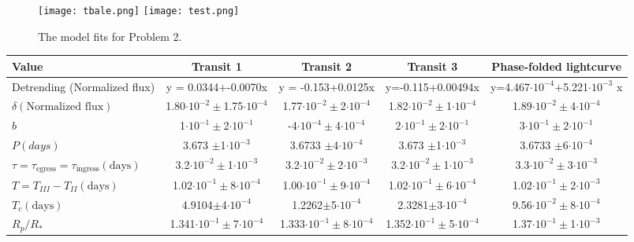 \documentclass[10pt, preprint]{aastex}
\begin{document}
\begin{figure}
\texttt{[image: tbale.png]}
\endminipage
{}
\texttt{[image: test.png]}
\endminipage\hfill
\caption{The model fits for Problem 2.\label{chi}}
\end{figure}

\begin{table}
  \footnotesize
  \begin{tabular}{lcccc}
    {\bf Value} & {\bf Transit 1} & {\bf Transit 2} & {\bf Transit 3} & {\bf Phase-folded lightcurve} \\
    \hline
    Detrending (Normalized flux) & 
    y = 0.0344+-0.0070x & y = -0.153+0.0125x & y=-0.115+0.00494x & y=4.467$\cdot10^{-4}$+5.221$\cdot10^{-3}$ x \\

$\delta (\text{Normalized flux})$ & 1.80$\cdot10^{-2}\pm$1.75$\cdot10^{-4}$ &
1.77$\cdot10^{-2}\pm$2$\cdot10^{-4}$&
1.82$\cdot10^{-2}\pm$1$\cdot10^{-4}$&
1.89$\cdot10^{-2}\pm$4$\cdot10^{-4}$ \\

$b $ & 1$\cdot10^{-1}\pm$2$\cdot10^{-1}$&
-4$\cdot10^{-4}\pm$4$\cdot10^{-4}$&
2$\cdot10^{-1}\pm$2$\cdot10^{-1}$&
3$\cdot10^{-1}\pm$2$\cdot10^{-1}$ \\

$P (days) $ & 3.673 $\pm$1$\cdot10^{-3}$&
3.6733 $\pm$4$\cdot10^{-4}$&
3.673 $\pm$1$\cdot10^{-3}$&
3.6733 $\pm$6$\cdot10^{-4}$ \\

$\tau=\tau_\text{egress}=\tau_\text{ingress} (\text{days})$ & 
3.2$\cdot10^{-2}\pm$1$\cdot10^{-3}$&
3.2$\cdot10^{-2}\pm$2$\cdot10^{-3}$&
3.2$\cdot10^{-2}\pm$1$\cdot10^{-3}$&
3.3$\cdot10^{-2}\pm$3$\cdot10^{-3}$ \\

$T=T_{III}-T_{II} (\text{days})$ &
1.02$\cdot10^{-1}\pm$8$\cdot10^{-4}$ &
1.00$\cdot10^{-1}\pm$9$\cdot10^{-4}$&
1.02$\cdot10^{-1}\pm$6$\cdot10^{-4}$&
1.02$\cdot10^{-1}\pm$2$\cdot10^{-3}$ \\

$T_c (\text{days})$ & 
4.9104$\pm$4$\cdot10^{-4}$&
1.2262$\pm$5$\cdot10^{-4}$&
2.3281$\pm$3$\cdot10^{-4}$&
9.56$\cdot10^{-2}\pm$8$\cdot10^{-4}$ \\

$R_p/R_*$ &1.341$\cdot10^{-1}\pm$7$\cdot10^{-4}$ &
1.333$\cdot10^{-1}\pm$8$\cdot10^{-4}$ &
1.352$\cdot10^{-1}\pm$5$\cdot10^{-4}$ &
1.37$\cdot10^{-1}\pm$1$\cdot10^{-3}$  \\


\end{tabular}
\end{table}
\end{document}
